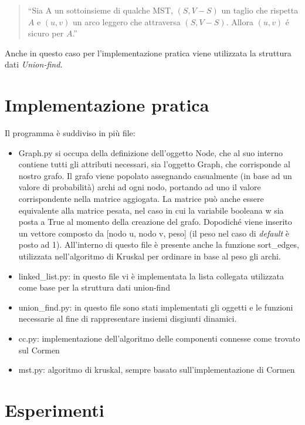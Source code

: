\documentclass[
]{article}
\begin{document}
\begin{quote}
``Sia A un sottoinsieme di qualche MST, \((S,V-S)\) un taglio che
rispetta \(A\) e \((u,v)\) un arco leggero che attraversa \((S,V-S)\).
Allora \((u,v)\) é sicuro per \(A\).''
\end{quote}

Anche in questo caso per l'implementazione pratica viene utilizzata la
struttura dati \emph{Union-find.}

\hypertarget{implementazione-pratica}{%
\section{Implementazione pratica}\label{implementazione-pratica}}

Il programma è suddiviso in più file:

\begin{itemize}
\item
  Graph.py si occupa della definizione dell'oggetto Node, che al suo
  interno contiene tutti gli attributi necessari, sia l'oggetto Graph,
  che corrisponde al nostro grafo. Il grafo viene popolato assegnando
  casualmente (in base ad un valore di probabilità) archi ad ogni nodo,
  portando ad uno il valore corrispondente nella matrice aggiogata. La
  matrice può anche essere equivalente alla matrice pesata, nel caso in
  cui la variabile booleana w sia posta a True al momento della
  creazione del grafo. Dopodiché viene inserito un vettore composto da
  {[}nodo u, nodo v, peso{]} (il peso nel caso di \emph{default} è posto
  ad 1). All'interno di questo file è presente anche la funzione
  sort\_edges, utilizzata nell'algoritmo di Kruskal per ordinare in base
  al peso gli archi.
\item
  linked\_list.py: in questo file vi è implementata la lista collegata
  utilizzata come base per la struttura dati union-find
\item
  union\_find.py: in questo file sono stati implementati gli oggetti e
  le funzioni necessarie al fine di rappresentare insiemi disgiunti
  dinamici.
\item
  cc.py: implementazione dell'algoritmo delle componenti connesse come
  trovato sul Cormen
\item
  mst.py: algoritmo di kruskal, sempre basato sull'implementazione di
  Cormen
\end{itemize}

\hypertarget{esperimenti}{%
\section{Esperimenti}\label{esperimenti}}
\end{document}
